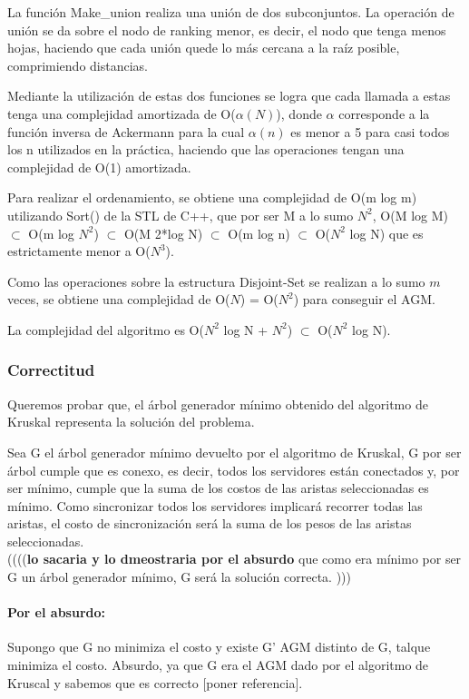 \documentclass[a4paper, 10pt, twoside]{article}
\begin{document}
La función Make\_union realiza una unión de dos subconjuntos. La operación de unión se da sobre el nodo de ranking menor, es decir, el nodo que tenga menos hojas, haciendo que cada unión quede lo más cercana a la raíz posible, comprimiendo distancias.

Mediante la utilización de estas dos funciones se logra que cada llamada a estas tenga una complejidad amortizada de O($\alpha(N)$), donde $\alpha$ corresponde a la función inversa de Ackermann para la cual $\alpha(n)$ es menor a 5 para casi todos los n utilizados en la práctica, haciendo que las operaciones tengan una complejidad de O(1) amortizada.

Para realizar el ordenamiento, se obtiene una complejidad de O(m log m) utilizando Sort() de la STL de C++, que por ser M a lo sumo $N^2$, O(M log M) $\subset$ O(m log $N^2$) $\subset$ O(M 2*log N) $\subset$ O(m log n) $\subset$ O($N^2$ log N) que es estrictamente menor a O($N^3$).

Como las operaciones sobre la estructura Disjoint-Set se realizan a lo sumo $m$ veces, se obtiene una complejidad de O($N$) = O($N^2$) para conseguir el AGM.

La complejidad del algoritmo es O($N^2$ log N + $N^2$) $\subset$ O($N^2$ log N).

\subsubsection{Correctitud}

Queremos probar que, el árbol generador mínimo obtenido del algoritmo de Kruskal representa la solución del problema.

Sea G el árbol generador mínimo devuelto por el algoritmo de Kruskal, G por ser árbol cumple que es conexo, es decir, todos los servidores están conectados y, por ser mínimo, cumple que la suma de los costos de las aristas seleccionadas es mínimo. Como sincronizar todos los servidores implicará recorrer todas las aristas, el costo de sincronización será la suma de los pesos de las aristas seleccionadas. \\
((((\textbf{lo sacaria y lo dmeostraria por el absurdo} que como era mínimo por ser G un árbol generador mínimo, G será la solución correcta. )))

\paragraph{Por el absurdo:\\}
Supongo que G no minimiza el costo y existe G' AGM distinto de G, talque minimiza el costo. Absurdo, ya que G era el AGM dado por el algoritmo de Kruscal y sabemos que es correcto [poner referencia].
\end{document}
